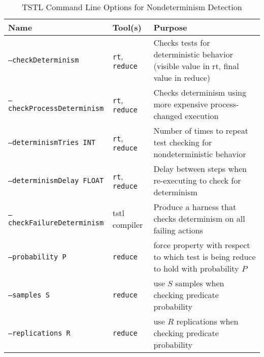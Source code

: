 \begin{table*}
\centering
{\scriptsize
\caption{TSTL Command Line Options for
  Nondeterminism Detection}
\label{tab:options}
{\scriptsize
\begin{tabular}{l|l|p{6cm}}
Name &  Tool(s) & Purpose \\
\hline
\hline
{\tt --checkDeterminism} & {\tt rt}, {\tt reduce} & Checks tests for deterministic
                                  behavior (visible value in rt, final
  value in reduce)\\
\hline
{\tt --checkProcessDeterminism} & {\tt rt}, {\tt reduce} & Checks determinism using more 
                                         expensive process-changed 
                                         execution \\
\hline
{\tt --determinismTries INT} & {\tt rt}, {\tt reduce} & Number of times to repeat test 
                                  checking for nondeterministic
                                  behavior \\
\hline 
{\tt --determinismDelay FLOAT} & {\tt rt}, {\tt reduce} & Delay between steps when 
                                  re-executing to check for
                                              determinism \\
\hline 
{\tt --checkFailureDeterminism} & tstl compiler & Produce a harness
                                                  that checks
                                                  determinism on all
                                                  failing actions \\
\hline 
{\tt --probability P} & {\tt reduce} & force property with respect to which 
                               test is being reduce to hold with 
                                 probability $P$ \\
\hline 
{\tt --samples S} & {\tt reduce} & use $S$ samples when checking predicate
                             probability\\
\hline 
{\tt --replications R} & {\tt reduce} & use $R$ replications when checking predicate probability\\
\hline
\hline

\end{tabular}
}
}
\end{table*}


